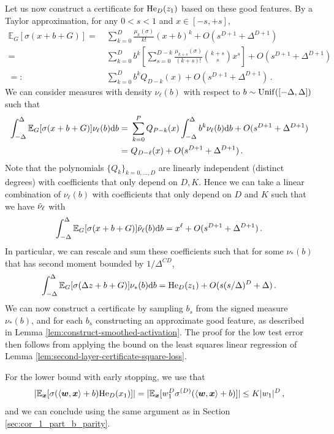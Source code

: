 \documentclass[11pt]{article}
\newcommand{\E}{\mathbb{E}}
\newcommand{\<}{\langle}
\renewcommand{\>}{\rangle}
\theoremstyle{definition}
\def\bw{{\boldsymbol w}}
\def\bx{{\boldsymbol x}}
\def\de{{\rm d}}
\def\de{{\rm d}}
\def\Unif{{\rm Unif}}
\def\Unif{{\sf Unif}}
\def\Unif{{\sf Unif}}
\def\He{{\rm He}}
\def\bw{{\boldsymbol w}}
\def\de{{\rm d}}
\def\bx{{\boldsymbol x}}
\def\Unif{{\rm Unif}}
\def\He{{\rm He}}
\begin{document}
Let us now construct a certificate for $\He_D (z_1)$ based on these good features. By a Taylor approximation, for any $0<s<1$ and $x  \in [-s,+s]$,
\[
\begin{aligned}
\E_G [  \sigma ( x + b + G )] =&~ \sum_{k=0}^D \frac{\mu_k (\sigma)}{k!} (x+b)^k + O(s^{D+1} + \Delta^{D+1}) \\ 
=&~ \sum_{k = 0}^D b^k \left[ \sum_{s = 0}^{D -k} \frac{\mu_{k+s}(\sigma)}{(k+s)!} {{k+s}\choose{s}} x^s \right] +  O(s^{D+1} + \Delta^{D+1}) \\ 
=: &~ \sum_{k = 0}^D b^k Q_{D-k} (x) + O(s^{D+1} + \Delta^{D+1}) \, .
\end{aligned}
\]
We can consider measures with density $\nu_\ell(b)$ with respect to $b \sim \Unif([-\Delta , \Delta])$ such that
\[
\begin{aligned}
\int_{-\Delta}^\Delta \E_G [  \sigma ( x+ b + G )] \nu_\ell (b) \de b =&~ \sum_{k=0}^P Q_{P-k} (x) \int_{-\Delta}^\Delta b^k \nu_\ell (b) \de b + O(s^{D+1} + \Delta^{D+1}) \\
=&~ Q_{D-\ell} (x) + O(s^{D+1} + \Delta^{D+1})  \, .
\end{aligned}
\]
Note that the polynomials $\{ Q_k\}_{k =0, \ldots , D}$ are linearly independent (distinct degrees) with coefficients that only depend on $D,K$. Hence we can take a linear combination of $\nu_\ell(b)$ with coefficients that only depend on $D$ and $K$ such that we have $\Tilde{\nu}_\ell$ with
\[
\int_{-\Delta}^\Delta \E_G [  \sigma ( x+ b + G )] \Tilde{\nu}_\ell (b) \de b = x^\ell + O(s^{D+1} + \Delta^{D+1}) \, . 
\]
In particular, we can rescale and sum these coefficients such that for some $\nu_* (b)$ that has second moment bounded by $1/\Delta^{CD}$,
\[
\int_{-\Delta}^\Delta \E_G [  \sigma ( \Delta z + b + G )] \nu_* (b) \de b =\He_D (z_1) + O(s(s/\Delta)^{D} + \Delta) \, .
\]
We can now construct a certificate by sampling $b_s$ from the signed measure $\nu_* (b)$, and for each $b_s$ constructing an approximate good feature, as described in Lemma \ref{lem:construct-smoothed-activation}. The proof for the low test error then follows from applying the bound on the least squares linear regression of Lemma \ref{lem:second-layer-certificate-square-loss}.

For the lower bound with early stopping, we use that
\[
| \E_\bx [ \sigma( \< \bw, \bx\> + b) \He_D (x_1) ]| = | \E_\bx [ w_1^D \sigma^{(D)} ( \< \bw, \bx\> + b) ] | \leq K | w_1|^D \, ,
\]
and we can conclude using the same argument as in Section \ref{sec:cor_1_part_b_parity}.
\end{document}
